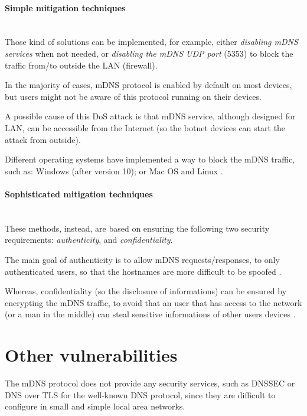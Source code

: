 \documentclass[fleqn, 11pt]{SelfArx} %
\begin{document}
\paragraph{Simple mitigation techniques}\mbox{}\\
Those kind of solutions can be implemented, for example, either {\it{disabling mDNS services}} when not needed, or
{\it{disabling the mDNS UDP port}} (5353) to block the traffic from/to outside the LAN (firewall).

In the majority of cases, mDNS protocol is enabled by default on most devices, but users might not be aware of this protocol running on their devices.

A possible cause of this DoS attack is that mDNS service, although designed for LAN, can be accessible from the Internet (so the botnet devices can start the attack from outside).

Different operating systems have implemented a way to block the mDNS traffic, such as: Windows \cite{blockWindowsMDNS}  (after version 10); or Mac OS and Linux \cite{blockMacOsLinuxMDNS}.

\paragraph{Sophisticated mitigation techniques}\mbox{}\\
These methods, instead, are based on ensuring the following two security requirements: {\it{authenticity}}, and {\it{confidentiality}}.

The main goal of authenticity is to allow mDNS requests/responses, to only authenticated users, so that the hostnames are more difficult to be spoofed \cite{Bai2016StayingSA, Bai2017AppleZH, WuTSB16}.

Whereas, confidentiality (so the disclosure of informations) can be ensured by encrypting the mDNS traffic, to avoid that an user that has access to the network (or a man in the middle) can steal sensitive informations of other users devices \cite{Kaiser2014AddingPT, EfficientmDNS}.

\section{Other vulnerabilities}
The mDNS protocol does not provide any security services, such as DNSSEC or DNS over TLS for the well-known DNS protocol, since they are difficult to configure in small and simple local area networks. 
\end{document}
